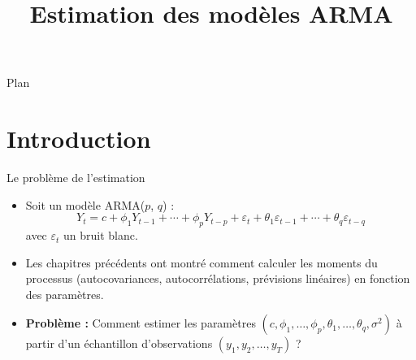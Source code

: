 \documentclass[11pt,aspectratio=169]{beamer}
\title{Estimation des modèles ARMA}
\author{}
\date{}
\institute{}
\begin{document}
\begin{frame}
\titlepage
\end{frame}

\begin{frame}{Plan}
\tableofcontents
\end{frame}

\section{Introduction}

\begin{frame}{Le problème de l'estimation}

\begin{itemize}

\item Soit un modèle ARMA($p$, $q$) :
  \[
  Y_t = c + \phi_1 Y_{t-1} + \cdots + \phi_p Y_{t-p} + \varepsilon_t + \theta_1 \varepsilon_{t-1} + \cdots + \theta_q \varepsilon_{t-q}
  \]
  avec $\varepsilon_t$ un bruit blanc.\newline

\item Les chapitres précédents ont montré comment calculer les moments du processus (autocovariances, autocorrélations, prévisions linéaires) en fonction des paramètres.\newline

\item \textbf{Problème :} Comment estimer les paramètres $(c, \phi_1, \ldots, \phi_p, \theta_1, \ldots, \theta_q, \sigma^2)$ à partir d'un échantillon d'observations $(y_1, y_2, \ldots, y_T)$ ?

\end{itemize}

\end{frame}
\end{document}
